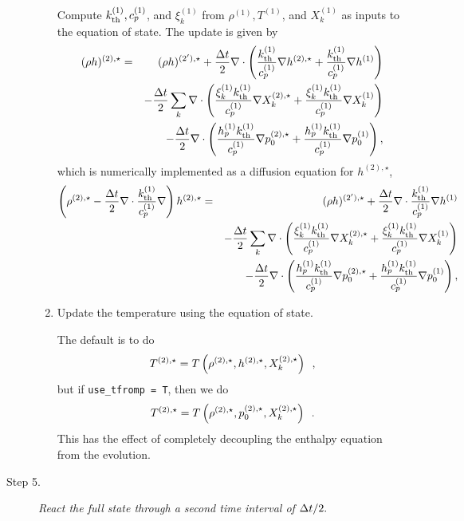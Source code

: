 \begin{description}
\begin{enumerate}
Compute $k_{\rm th}^{(1)}, c_p^{(1)}$, and $\xi_k^{(1)}$ from $\rho^{(1)}, T^{(1)}$, and $X_k^{(1)}$ as inputs to the equation of state.  The update is given by
\begin{eqnarray}
(\rho h)^{(2),\star} &=& (\rho h)^{(2'),\star} + \frac{\Delta t}{2}\nabla\cdot\left(\frac{k_{\rm th}^{(1)}}{c_p^{(1)}}\nabla h^{(2),\star} + \frac{k_{\rm th}^{(1)}}{c_p^{(1)}}\nabla h^{(1)}\right)\nonumber\\
&&- \frac{\Delta t}{2}\sum_k\nabla\cdot\left(\frac{\xi_k^{(1)}k_{\rm th}^{(1)}}{c_p^{(1)}}\nabla X_k^{(2),\star} + \frac{\xi_k^{(1)}k_{\rm th}^{(1)}}{c_p^{(1)}}\nabla X_k^{(1)}\right)\nonumber\\
&&- \frac{\Delta t}{2}\nabla\cdot\left(\frac{h_p^{(1)}k_{\rm th}^{(1)}}{c_p^{(1)}}\nabla p_0^{(2),\star} + \frac{h_p^{(1)}k_{\rm th}^{(1)}}{c_p^{(1)}}\nabla p_0^{(1)}\right),
\end{eqnarray}
which is numerically implemented as a diffusion equation for $h^{(2),\star}$,
\begin{eqnarray}
\left(\rho^{(2),\star} - \frac{\Delta t}{2}\nabla\cdot\frac{k_{\rm th}^{(1)}}{c_p^{(1)}}\nabla\right)h^{(2),\star} &=& (\rho h)^{(2'),\star} + \frac{\Delta t}{2}\nabla\cdot\frac{k_{\rm th}^{(1)}}{c_p^{(1)}}\nabla h^{(1)}\nonumber\\
&&- \frac{\Delta t}{2}\sum_k\nabla\cdot\left(\frac{\xi_k^{(1)}k_{\rm th}^{(1)}}{c_p^{(1)}}\nabla X_k^{(2),\star} + \frac{\xi_k^{(1)}k_{\rm th}^{(1)}}{c_p^{(1)}}\nabla X_k^{(1)}\right)\nonumber\\
&&- \frac{\Delta t}{2}\nabla\cdot\left(\frac{h_p^{(1)}k_{\rm th}^{(1)}}{c_p^{(1)}}\nabla p_0^{(2),\star} + \frac{h_p^{(1)}k_{\rm th}^{(1)}}{c_p^{(1)}}\nabla p_0^{(1)}\right),
\end{eqnarray}
\item Update the temperature using the equation of state.

The default is to do
\begin{equation}
T^{(2),\star} = T\left(\rho^{(2),\star}, h^{(2),\star}, X_k^{(2),\star}\right) \enskip ,
\end{equation}
but if {\tt use\_tfromp = T}, then we do
\begin{equation}
T^{(2),\star} = T\left(\rho^{(2),\star}, p_0^{(2),\star}, X_k^{(2),\star}\right) \enskip .
\end{equation}
This has the effect of completely decoupling the enthalpy equation from the 
evolution.


\end{enumerate}

\item[Step 5.] {\em React the full state through a second time interval of $\Delta t / 2.$}


\end{description}
